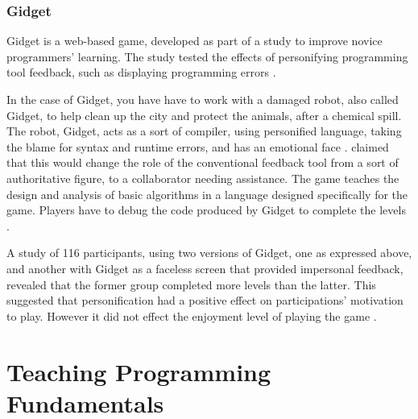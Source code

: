 \documentclass[a4paper,11.5pt]{report}
\numberwithin{figure}{section}
\numberwithin{table}{section}
\numberwithin{equation}{section}
\numberwithin{equation}{section}
\begin{document}
\subsubsection*{Gidget}

Gidget is a web-based game, developed as part of a study to improve novice programmers' learning. The study tested the effects of personifying programming tool feedback, such as displaying programming errors \citep{gidget}. 

In the case of Gidget, you have have to work with a damaged robot, also called Gidget, to help clean up the city and protect the animals, after a chemical spill. The robot, Gidget, acts as a sort of compiler, using personified language, taking the blame for syntax and runtime errors, and has an emotional face \citep{gidget}. \citeauthor{gidget} claimed that this would change the role of the conventional feedback tool from a sort of authoritative figure, to a collaborator needing assistance. The game teaches the design and analysis of basic algorithms in a language designed specifically for the game. Players have to debug the code produced by Gidget to complete the levels \citep{gidget}.

A study of 116 participants, using two versions of Gidget, one as expressed above, and another with Gidget as a faceless screen that provided impersonal feedback, revealed that the former group completed more levels than the latter. This suggested that personification had a positive effect on participations' motivation to play. However it did not effect the enjoyment level of playing the game \citep{gidget}.













\section{Teaching Programming Fundamentals}
\end{document}
